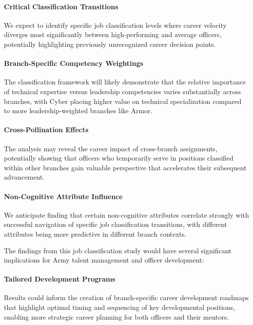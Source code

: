 \documentclass[../main.tex]{subfiles}
\begin{document}
\paragraph{Critical Classification Transitions} We expect to identify specific job classification levels where career velocity diverges most significantly between high-performing and average officers, potentially highlighting previously unrecognized career decision points.

\paragraph{Branch-Specific Competency Weightings} The classification framework will likely demonstrate that the relative importance of technical expertise versus leadership competencies varies substantially across branches, with Cyber placing higher value on technical specialization compared to more leadership-weighted branches like Armor.

\paragraph{Cross-Pollination Effects} The analysis may reveal the career impact of cross-branch assignments, potentially showing that officers who temporarily serve in positions classified within other branches gain valuable perspective that accelerates their subsequent advancement.

\paragraph{Non-Cognitive Attribute Influence} We anticipate finding that certain non-cognitive attributes correlate strongly with successful navigation of specific job classification transitions, with different attributes being more predictive in different branch contexts.

The findings from this job classification study would have several significant implications for Army talent management and officer development:

\paragraph{Tailored Development Programs} Results could inform the creation of branch-specific career development roadmaps that highlight optimal timing and sequencing of key developmental positions, enabling more strategic career planning for both officers and their mentors.
\end{document}

